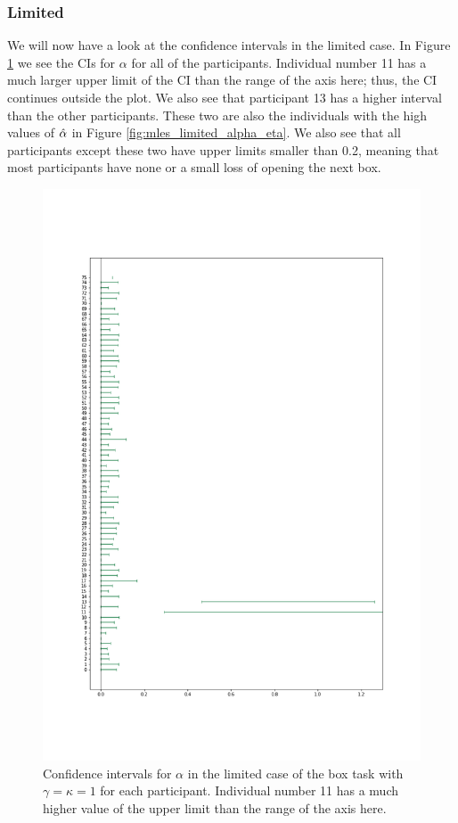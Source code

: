 \subsubsection{Limited}
We will now have a look at the confidence intervals in the limited case. In Figure \ref{fig:all_cis_alpha_lim} we see the CIs for $\alpha$ for all of the participants. Individual number 11 has a much larger upper limit of the CI than the range of the axis here; thus, the CI continues outside the plot. We also see that participant 13 has a higher interval than the other participants. These two are also the individuals with the high values of $\hat{\alpha}$ in Figure \ref{fig:mles_limited_alpha_eta}. We also see that all participants except these two have upper limits smaller than 0.2, meaning that most participants have none or a small loss of opening the next box. 
\begin{figure}
    \centering
    \includegraphics[scale=0.37]{pictures/all_cis_lim_alpha.png} %
    \caption[CIs for $\alpha$, limited. $\gamma=\kappa=1$]{Confidence intervals for $\alpha$ in the limited case of the box task with $\gamma=\kappa=1$ for each participant. Individual number 11 has a much higher value of the upper limit than the range of the axis here. }
    \label{fig:all_cis_alpha_lim}
\end{figure}

